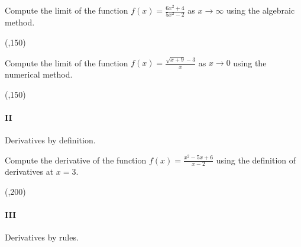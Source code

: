 \begin{preguntas}
\begin{minipage}{0.4\textwidth}
\begin{tikzpicture}[
    scale=1.0,
    >=Stealth,
    declare function={
        f(\x) = \x/abs(\x); %
    }
]
\end{tikzpicture}

\vspace{75}

\end{minipage}

\pregunta[7] Compute the limit of the function \(f(x) = \frac{6x^2 + 4}{5x^2 - 2}\) as $x\to\infty$ using the algebraic method.

\begin{center}
    \framebox(\textwidth,150){} 
\end{center}

\newpage

\pregunta[7] Compute the limit of the function \(f(x) = \frac{\sqrt{x+9} - 3}{x}\) as $x\to0$ using the numerical method.

\begin{center}
    \framebox(\textwidth,150){} 
\end{center}

\end{preguntas}


\paragraph{II} Derivatives by definition. 

\begin{preguntas}

\pregunta[20] Compute the derivative of the function \(f(x) = \frac{x^2 - 5x + 6}{x-2}\) using the definition of derivatives at $x=3$. 

\begin{center}
    \framebox(\textwidth,200){} 
\end{center}

\end{preguntas}


\paragraph{III} Derivatives by rules.

